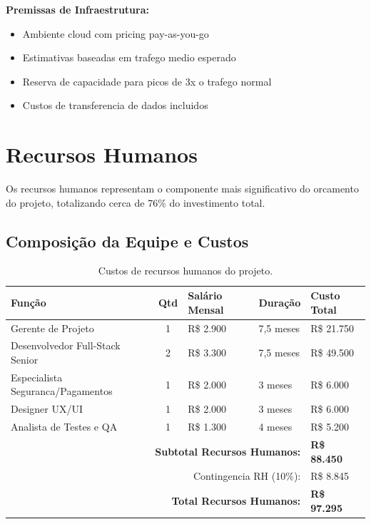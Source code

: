\textbf{Premissas de Infraestrutura:}
\begin{itemize}
    \item Ambiente cloud com pricing pay-as-you-go
    \item Estimativas baseadas em trafego medio esperado
    \item Reserva de capacidade para picos de 3x o trafego normal
    \item Custos de transferencia de dados incluidos
\end{itemize}

\section{Recursos Humanos}

Os recursos humanos representam o componente mais significativo do orcamento do projeto, totalizando cerca de 76\% do investimento total.

\subsection{Composição da Equipe e Custos}

\begin{table}[H]
\centering
\caption{Custos de recursos humanos do projeto.}%
\label{tab:rh-custos}
\small
\begin{tabular}{|p{3.5cm}|c|p{2.5cm}|p{2cm}|p{2.5cm}|}
\hline
\textbf{Função} & \textbf{Qtd} & \textbf{Salário Mensal} & \textbf{Duração} & \textbf{Custo Total} \\ \hline
Gerente de Projeto & 1 & R\$ 2.900 & 7,5 meses & R\$ 21.750 \\ \hline
Desenvolvedor Full-Stack Senior & 2 & R\$ 3.300 & 7,5 meses & R\$ 49.500 \\ \hline
Especialista Seguranca/Pagamentos & 1 & R\$ 2.000 & 3 meses & R\$ 6.000 \\ \hline
Designer UX/UI & 1 & R\$ 2.000 & 3 meses & R\$ 6.000 \\ \hline
Analista de Testes e QA & 1 & R\$ 1.300 & 4 meses & R\$ 5.200 \\ \hline
\multicolumn{4}{|r|}{\textbf{Subtotal Recursos Humanos:}} & \textbf{R\$ 88.450} \\ \hline
\multicolumn{4}{|r|}{Contingencia RH (10\%):} & R\$ 8.845 \\ \hline
\multicolumn{4}{|r|}{\textbf{Total Recursos Humanos:}} & \textbf{R\$ 97.295} \\ \hline
\end{tabular}
\end{table}

